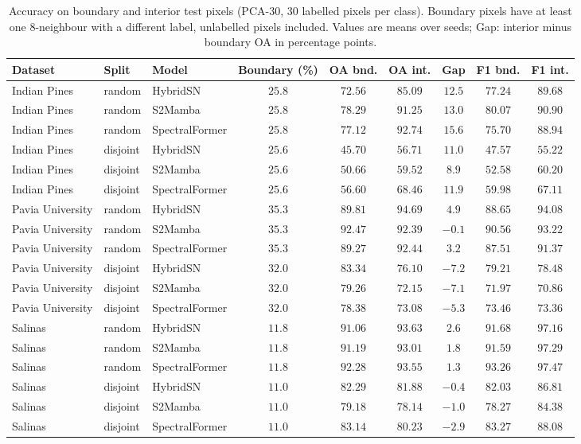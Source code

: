 \begin{table}[!t]
\centering
\caption{Accuracy on boundary and interior test pixels (PCA-30, 30 labelled pixels per class). Boundary pixels have at least one 8-neighbour with a different label, unlabelled pixels included. Values are means over seeds; Gap: interior minus boundary OA in percentage points.}
\label{tab:boundary}
\scriptsize
\setlength{\tabcolsep}{3pt}
\begin{tabular}{lllcccccc}
\toprule
\textbf{Dataset} & \textbf{Split} & \textbf{Model} & \textbf{Boundary (\%)} & \textbf{OA bnd.} & \textbf{OA int.} & \textbf{Gap} & \textbf{F1 bnd.} & \textbf{F1 int.} \\
\midrule
Indian Pines & random & HybridSN & $25.8$ & $72.56$ & $85.09$ & $12.5$ & $77.24$ & $89.68$ \\
Indian Pines & random & S2Mamba & $25.8$ & $78.29$ & $91.25$ & $13.0$ & $80.07$ & $90.90$ \\
Indian Pines & random & SpectralFormer & $25.8$ & $77.12$ & $92.74$ & $15.6$ & $75.70$ & $88.94$ \\
Indian Pines & disjoint & HybridSN & $25.6$ & $45.70$ & $56.71$ & $11.0$ & $47.57$ & $55.22$ \\
Indian Pines & disjoint & S2Mamba & $25.6$ & $50.66$ & $59.52$ & $8.9$ & $52.58$ & $60.20$ \\
Indian Pines & disjoint & SpectralFormer & $25.6$ & $56.60$ & $68.46$ & $11.9$ & $59.98$ & $67.11$ \\
Pavia University & random & HybridSN & $35.3$ & $89.81$ & $94.69$ & $4.9$ & $88.65$ & $94.08$ \\
Pavia University & random & S2Mamba & $35.3$ & $92.47$ & $92.39$ & $-0.1$ & $90.56$ & $93.22$ \\
Pavia University & random & SpectralFormer & $35.3$ & $89.27$ & $92.44$ & $3.2$ & $87.51$ & $91.37$ \\
Pavia University & disjoint & HybridSN & $32.0$ & $83.34$ & $76.10$ & $-7.2$ & $79.21$ & $78.48$ \\
Pavia University & disjoint & S2Mamba & $32.0$ & $79.26$ & $72.15$ & $-7.1$ & $71.97$ & $70.86$ \\
Pavia University & disjoint & SpectralFormer & $32.0$ & $78.38$ & $73.08$ & $-5.3$ & $73.46$ & $73.36$ \\
Salinas & random & HybridSN & $11.8$ & $91.06$ & $93.63$ & $2.6$ & $91.68$ & $97.16$ \\
Salinas & random & S2Mamba & $11.8$ & $91.19$ & $93.01$ & $1.8$ & $91.59$ & $97.29$ \\
Salinas & random & SpectralFormer & $11.8$ & $92.28$ & $93.55$ & $1.3$ & $93.26$ & $97.47$ \\
Salinas & disjoint & HybridSN & $11.0$ & $82.29$ & $81.88$ & $-0.4$ & $82.03$ & $86.81$ \\
Salinas & disjoint & S2Mamba & $11.0$ & $79.18$ & $78.14$ & $-1.0$ & $78.27$ & $84.38$ \\
Salinas & disjoint & SpectralFormer & $11.0$ & $83.14$ & $80.23$ & $-2.9$ & $83.27$ & $88.08$ \\
\bottomrule
\end{tabular}
\end{table}
